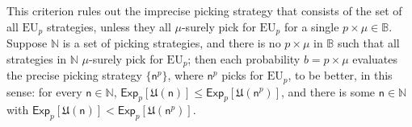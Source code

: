 \documentclass[a4paper]{article}
\renewcommand\P{\mathbb{P}} %
\newcommand\Exp{\mathsf{Exp}}
\newcommand\EU{\mathrm{EU}}
\newcommand\EAd{\mathrm{EAd}}
\newcommand\U{\mathfrak{U}} %
\newcommand{\n}{\mathsf{n}}
\newcommand{\imprecpickstrat}{\mathbb{N}}
\newcommand{\IB}{\mathbb{B}}
\newcommand{\IP}{\P}
\newcommand{\todoold}[2][]{\todo[backgroundcolor=white,bordercolor=orange!10,linecolor=gray!10, #1,caption={},textcolor=gray]{Pre-rev: #2}}
\newcommand{\todooldinfo}[2][]{\todoold[#1]{#2}}
\renewcommand{\leq}{\leqslant}
\newenvironment{CCM rewritten}
{\begingroup\color{blue}} %
{\endgroup}              %
\begin{document}
	This criterion rules out the imprecise picking strategy that consists of the set of all $\EU_p$ strategies, unless they all $\mu$-surely pick for $\EU_p$ for a single $p \times \mu\in\IB$. 
	Suppose $\imprecpickstrat$ is a set of picking strategies, and there is no $p \times \mu$ in $\IB$ such that all strategies in $\imprecpickstrat$ $\mu$-surely pick for $\EU_p$; then each probability $b=p\times \mu$ evaluates the precise picking strategy $\{\n^p\}$, where $\n^p$ picks for $\EU_p$, to be better, in this sense: for every $\n\in\imprecpickstrat$, $\Exp_p[\U(\n)]\leq \Exp_p[\U(\n^p)]$, and there is some $\n\in\imprecpickstrat$ with $\Exp_p[\U(\n)]<\Exp_p[\U(\n^p)]$. 
%	 
	
\end{document}
